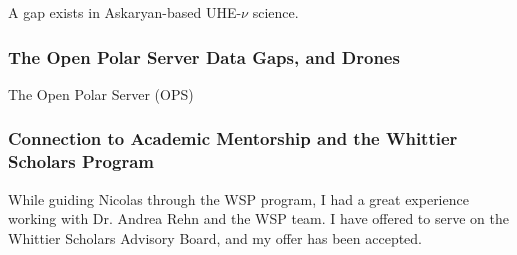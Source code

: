 \documentclass[../../../main.tex]{subfiles}
\begin{document}
A gap exists in Askaryan-based UHE-$\nu$ science. 

\subsubsection{The Open Polar Server Data Gaps, and Drones}

The Open Polar Server (OPS)

\subsubsection{Connection to Academic Mentorship and the Whittier Scholars Program}

While guiding Nicolas through the WSP program, I had a great experience working with Dr. Andrea Rehn and the WSP team.  I have offered to serve on the Whittier Scholars Advisory Board, and my offer has been accepted.
\end{document}
